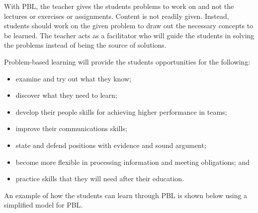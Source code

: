 With PBL, the teacher gives the students problems to work on and not the lectures or
exercises or assignments. Content is not readily given. Instead, students should work on the
given problem to draw out the necessary concepts to be learned. The teacher acts as a
facilitator who will guide the students in solving the problems instead of being the source of
solutions.

Problem-based learning will provide the students opportunities for the following:
\begin{itemize}
\item examine and try out what they know;
\item discover what they need to learn;
\item develop their people skills for achieving higher performance in teams;
\item improve their communications skills;
\item state and defend positions with evidence and sound argument;
\item become more flexible in processing information and meeting obligations; and
\item practice skills that they will need after their education.
\end{itemize}
An example of how the students can learn through PBL is shown below using a simplified
model for PBL.
